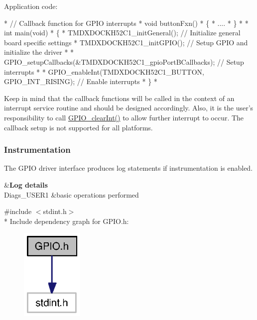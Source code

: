 Application code\-: 
\begin{DoxyCode}
*  \textcolor{comment}{// Callback function for GPIO interrupts}
*  \textcolor{keywordtype}{void} buttonFxn()
*  \{
*      ....
*  \}
*
*  \textcolor{keywordtype}{int} main(\textcolor{keywordtype}{void})
*  \{
*      TMDXDOCKH52C1\_initGeneral(); \textcolor{comment}{// Initialize general board specific settings}
*      TMDXDOCKH52C1\_initGPIO(); \textcolor{comment}{// Setup GPIO and initialize the driver}
*
*      GPIO_setupCallbacks(&TMDXDOCKH52C1\_gpioPortBCallbacks); \textcolor{comment}{// Setup interrupts}
*
*      GPIO_enableInt(TMDXDOCKH52C1\_BUTTON, GPIO_INT_RISING); \textcolor{comment}{// Enable interrupts}
*  \}
*  
\end{DoxyCode}


Keep in mind that the callback functions will be called in the context of an interrupt service routine and should be designed accordingly. Also, it is the user's responsibility to call \hyperlink{_g_p_i_o_8h_ad890aa2518ec2f4c88419dc4036b6197}{G\-P\-I\-O\-\_\-clear\-Int()} to allow further interrupt to occur. The callback setup is not supported for all platforms.

\subsubsection*{Instrumentation}

The G\-P\-I\-O driver interface produces log statements if instrumentation is enabled.

\begin{TabularC}{2}
\hline
{}&{\bf Log details  }\\
Diags\-\_\-\-U\-S\-E\-R1 &basic operations performed \\
\end{TabularC}


{\ttfamily \#include $<$stdint.\-h$>$}\\*
Include dependency graph for G\-P\-I\-O.\-h\-:
\nopagebreak
\begin{figure}[H]
\begin{center}
\leavevmode
\includegraphics[width=85pt]{_g_p_i_o_8h__incl}
\end{center}
\end{figure}
